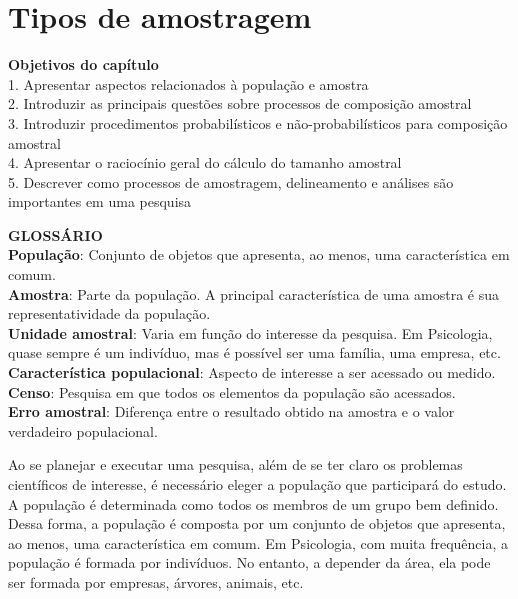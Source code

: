 \documentclass[
]{book}
\newenvironment{objectives}{
  \definecolor{shadecolor}{rgb}{0.764,0.992,0.686}  %
  \color{black}
  \begin{shaded}}
 {\end{shaded}}
\begin{document}
\hypertarget{tipos-de-amostragem}{%
\chapter{Tipos de amostragem}\label{tipos-de-amostragem}}

\begin{objectives}
\textbf{Objetivos do capítulo}\\
1. Apresentar aspectos relacionados à população e amostra\\
2. Introduzir as principais questões sobre processos de composição amostral\\
3. Introduzir procedimentos probabilísticos e não-probabilísticos para composição amostral\\
4. Apresentar o raciocínio geral do cálculo do tamanho amostral\\
5. Descrever como processos de amostragem, delineamento e análises são importantes em uma pesquisa

\end{objectives}

\textbf{GLOSSÁRIO}\\
\textbf{População}: Conjunto de objetos que apresenta, ao menos, uma característica em comum.\\
\textbf{Amostra}: Parte da população. A principal característica de uma amostra é sua representatividade da população.\\
\textbf{Unidade amostral}: Varia em função do interesse da pesquisa. Em Psicologia, quase sempre é um indivíduo, mas é possível ser uma família, uma empresa, etc.\\
\textbf{Característica populacional}: Aspecto de interesse a ser acessado ou medido.\\
\textbf{Censo}: Pesquisa em que todos os elementos da população são acessados.\\
\textbf{Erro amostral}: Diferença entre o resultado obtido na amostra e o valor verdadeiro populacional.

Ao se planejar e executar uma pesquisa, além de se ter claro os problemas científicos de interesse, é necessário eleger a população que participará do estudo. A população é determinada como todos os membros de um grupo bem definido. Dessa forma, a população é composta por um conjunto de objetos que apresenta, ao menos, uma característica em comum. Em Psicologia, com muita frequência, a população é formada por indivíduos. No entanto, a depender da área, ela pode ser formada por empresas, árvores, animais, etc.
\end{document}
